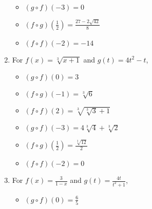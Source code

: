 \documentclass{ximera}
\begin{document}
\begin{enumerate}
\begin{multicols}{3}
\begin{itemize}
\item  $(g\circ f)(-3) = 0$

\item  $(f\circ g)\left(\frac{1}{2}\right) = \frac{27-2\sqrt{42}}{8}$

\item  $(f \circ f)(-2) = -14$

\end{itemize}

\end{multicols}

\newpage

\item  For  $f(x) = \sqrt[3]{x+1}$ and $g(t) = 4t^2-t$,
\begin{multicols}{3}

\begin{itemize}

\item  $(g\circ f)(0) = 3$

\item  $(f\circ g)(-1) = \sqrt[3]{6}$

\item  $(f \circ f)(2) = \sqrt[3]{\sqrt[3]{3}+1}$

\end{itemize}

\end{multicols}

\begin{multicols}{3}

\begin{itemize}

\item  $(g\circ f)(-3) = 4\sqrt[3]{4}+\sqrt[3]{2}$

\item  $(f\circ g)\left(\frac{1}{2}\right) = \frac{\sqrt[3]{12}}{2}$

\item  $(f \circ f)(-2) = 0$

\end{itemize}

\end{multicols}

\item  For  $f(x) = \frac{3}{1-x}$ and $g(t) = \frac{4t}{t^2+1}$,
\begin{multicols}{3}

\begin{itemize}

\item  $(g\circ f)(0) = \frac{6}{5}$


\end{itemize}
\end{multicols}
\end{enumerate}
\end{document}
